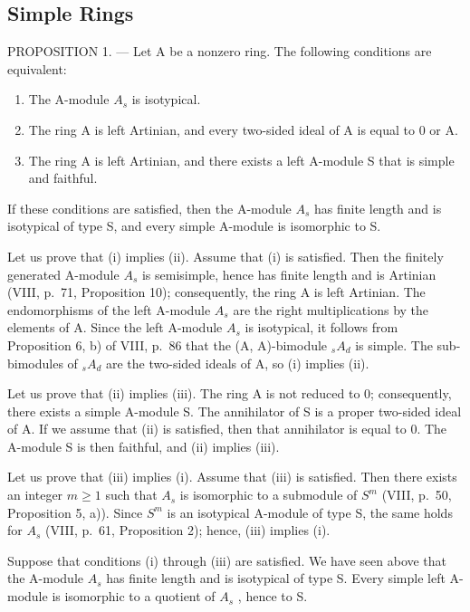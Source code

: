 \subsection{Simple Rings}

PROPOSITION 1. --- Let A be a nonzero ring. The following conditions are equivalent:

\begin{enumerate}
\def\labelenumi{(\roman{enumi})}
\item
  The A-module \(A_{s}\) is isotypical.
\item
  The ring A is left Artinian, and every two-sided ideal of A is equal to 0 or A.
\item
  The ring A is left Artinian, and there exists a left A-module S that is simple and faithful.
\end{enumerate}

If these conditions are satisfied, then the A-module \(A_{s}\) has finite length and is isotypical of type S, and every simple A-module is isomorphic to S.

Let us prove that (i) implies (ii). Assume that (i) is satisfied. Then the finitely generated A-module \(A_{s}\) is semisimple, hence has finite length and is Artinian (VIII, p.~71, Proposition 10); consequently, the ring A is left Artinian. The endomorphisms of the left A-module \(A_{s}\) are the right multiplications by the elements of A. Since the left A-module \(A_{s}\) is isotypical, it follows from Proposition 6, b) of VIII, p.~86 that the (A, A)-bimodule \(_{s}A_{d}\) is simple. The sub-bimodules of \(_{s}A_{d}\) are the two-sided ideals of A, so (i) implies (ii).

Let us prove that (ii) implies (iii). The ring A is not reduced to 0; consequently, there exists a simple A-module S. The annihilator of S is a proper two-sided ideal of A. If we assume that (ii) is satisfied, then that annihilator is equal to 0. The A-module S is then faithful, and (ii) implies (iii).

Let us prove that (iii) implies (i). Assume that (iii) is satisfied. Then there exists an integer \(m \geqslant 1\) such that \(A_{s}\) is isomorphic to a submodule of \(S^{m}\) (VIII, p.~50, Proposition 5, a)). Since \(S^{m}\) is an isotypical A-module of type S, the same holds for \(A_{s}\) (VIII, p.~61, Proposition 2); hence, (iii) implies (i).

Suppose that conditions (i) through (iii) are satisfied. We have seen above that the A-module \(A_{s}\) has finite length and is isotypical of type S. Every simple left A-module is isomorphic to a quotient of \(A_{s}\) , hence to S.

